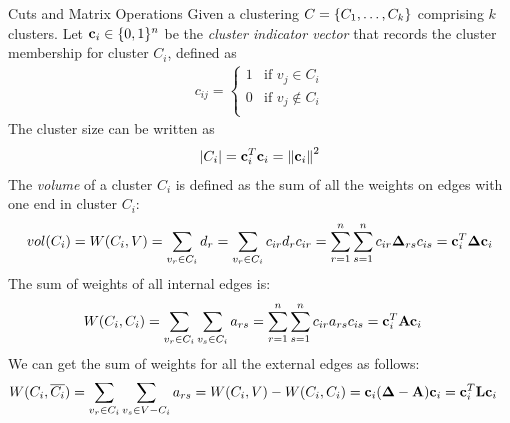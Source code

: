 \begin{frame}{Cuts and Matrix Operations}
  \small
Given a clustering ${\relax C} = \{C_1,\dots,C_k\}$ comprising $k$ clusters.
Let $\mathbf{c}_i \in \{0,1\}^n$ be the {\em cluster indicator vector}
that records the cluster membership for cluster $C_i$, def\/{i}ned as
\begin{align*}
    c_{ij} =
        \begin{cases}
            1 & \text{if $v_{j} \in C_i$}\\
            0 & \text{if $v_{j} \not\in C_i$}\\
        \end{cases}
\end{align*}
The cluster size can be written as
\begin{align*}
    |C_i| = \mathbf{c}_i^T\mathbf{c}_i = \left\lVert\mathbf{c}_i\right\rVert^2
\end{align*}
The {\em volume} of a cluster
$C_i$ is def\/{i}ned as the sum of all the weights on edges with one
end in cluster $C_i$:
\begin{align*}
    vol(C_i) = W(C_i, V)  = \sum_{v_r \in C_i} d_r
    = \sum_{v_r \in C_i} c_{ir} d_r c_{ir}
     = \sum_{r=1}^n \sum_{s=1}^n c_{ir} {\bm \Delta}_{rs} c_{is}
     = \mathbf{c}_i^T {\bm \Delta} \mathbf{c}_i
\end{align*}
The sum of weights of all internal edges is:
\begin{align*}
    W(C_i, C_i) & = \sum_{v_r \in C_i} \sum_{v_s \in C_i}
    a_{rs}
     = \sum_{r=1}^n \sum_{s=1}^n c_{ir} a_{rs} c_{is} = \mathbf{c}_i^T
    \mathbf{A} \mathbf{c}_i
\end{align*}
We can get the sum of weights for all the external edges as follows:
\begin{align*}
    W(C_i, \overline{C_i}) & = \sum_{v_r \in C_i} \sum_{v_s \in
    V- C_i} a_{rs} = W(C_i,V) - W(C_i,C_i)
     = \mathbf{c}_i ({\bm \Delta} - \mathbf{A}) \mathbf{c}_i = \mathbf{c}_i^T \mathbf{L} \mathbf{c}_i
\end{align*}
\end{frame}



